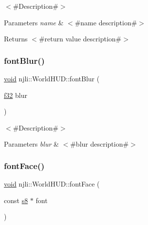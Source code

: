 $<$\#\+Description\#$>$


\begin{DoxyParams}{Parameters}
{\em name} & $<$\#name description\#$>$\\
\hline
\end{DoxyParams}
\begin{DoxyReturn}{Returns}
$<$\#return value description\#$>$ 
\end{DoxyReturn}
\mbox{\label{classnjli_1_1_world_h_u_d_ac2e332b4befffbab6b44e2ea61ad0911}} 
\subsubsection{\texorpdfstring{font\+Blur()}{fontBlur()}}
{\footnotesize\ttfamily \mbox{\hyperlink{_thread_8h_af1e856da2e658414cb2456cb6f7ebc66}{void}} njli\+::\+World\+H\+U\+D\+::font\+Blur (\begin{DoxyParamCaption}\item[{\mbox{\hyperlink{_util_8h_a5f6906312a689f27d70e9d086649d3fd}{f32}}}]{blur }\end{DoxyParamCaption})}

$<$\#\+Description\#$>$


\begin{DoxyParams}{Parameters}
{\em blur} & $<$\#blur description\#$>$ \\
\hline
\end{DoxyParams}
\mbox{\label{classnjli_1_1_world_h_u_d_a2e000d08f0aacae74231570760f0c7d9}} 
\subsubsection{\texorpdfstring{font\+Face()}{fontFace()}}
{\footnotesize\ttfamily \mbox{\hyperlink{_thread_8h_af1e856da2e658414cb2456cb6f7ebc66}{void}} njli\+::\+World\+H\+U\+D\+::font\+Face (\begin{DoxyParamCaption}\item[{const \mbox{\hyperlink{_util_8h_a2ff401e087cf786c38a6812723e94473}{s8}} $\ast$}]{font }\end{DoxyParamCaption})}

